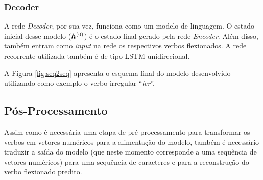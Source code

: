 \subsubsection{Decoder}

A rede \textit{Decoder}, por sua vez, funciona como um modelo de linguagem. O estado inicial desse modelo ($\bm{h}^{(0)}$) é o estado final gerado pela rede \textit{Encoder}. Além disso, também entram como \textit{input} na rede os respectivos verbos flexionados. A rede recorrente utilizada também é de tipo LSTM unidirecional.

A Figura \ref{fig:seq2seq} apresenta o esquema final do modelo desenvolvido utilizando como exemplo o verbo irregular “\textit{ler}”.










 \subsection{Pós-Processamento}

Assim como é necessária uma etapa de pré-processamento para transformar os verbos em vetores numéricos para a alimentação do modelo, também é necessário traduzir a saída do modelo (que neste momento corresponde a uma sequência de vetores numéricos) para uma sequência de caracteres e para a reconstrução do verbo flexionado predito.

